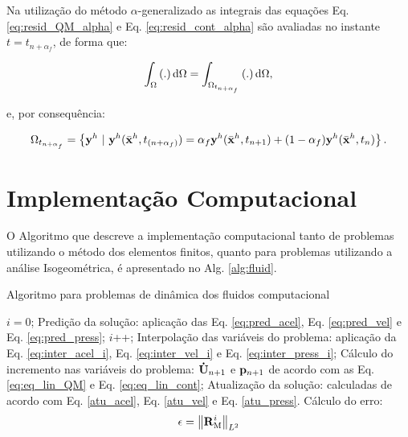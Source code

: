 \documentclass[tese_patricia]{subfiles}%
\begin{document}
Na utilização do método $\alpha$-generalizado as integrais das equações Eq. \eqref{eq:resid_QM_alpha} e Eq. \eqref{eq:resid_cont_alpha} são avaliadas no instante $t = t_{n+\alpha_{f}}$, de forma que:

\begin{align}
\int_{\Omega} \left(.\right) \mathrm{d} \Omega = \int_{\Omega_{t_{n+\alpha_{f}}}} \left(.\right) \mathrm{d} \Omega,
\end{align}

\noindent e, por consequência:

\begin{align}
\Omega_{t_{n+\alpha_{f}}} = \left\{\mathbf{y}^h \  |\  \mathbf{y}^h(\bar{\mathbf{x}}^h,t_{(n+\alpha_f)}) = \alpha_f \mathbf{y}^h(\bar{\mathbf{x}}^h,t_{n+1}) + (1-\alpha_f) \mathbf{y}^h(\bar{\mathbf{x}}^h,t_n)  \right\}.
\end{align}


\section{Implementação Computacional} \label{capitulo:Cap2:DFCComputationalCode}


O Algoritmo que descreve a implementação computacional tanto de problemas utilizando o método dos elementos finitos, quanto para problemas utilizando a análise Isogeométrica, é apresentado no Alg. \ref{alg:fluid}.

\begin{algorithm}
	\caption{Algoritmo para problemas de dinâmica dos fluidos computacional}
	\label{alg:fluid}
	\begin{algorithmic}[1]
		\State $i=0$;
		\State Predição da solução: aplicação das Eq. \eqref{eq:pred_acel}, Eq. \eqref{eq:pred_vel} e Eq. \eqref{eq:pred_press};
		\State $i$++;
		\State Interpolação das variáveis do problema: aplicação da Eq. \eqref{eq:inter_acel_i}, Eq. \eqref {eq:inter_vel_i} e Eq. \eqref{eq:inter_press_i};
		\State Cálculo do incremento nas variáveis do problema: $\mathbf{\dot{U}}_{n+1}$ e $\mathbf{p}_{n+1}$ de acordo com as Eq. \eqref{eq:eq_lin_QM} e Eq. \eqref{eq:eq_lin_cont};
		\State Atualização da solução: calculadas de acordo com Eq. \eqref{atu_acel}, Eq. \eqref{atu_vel} e Eq. \eqref{atu_press}.
		\State Cálculo do erro:
		\begin{align}
		\epsilon =\left\| \mathbf{R}_\mathrm{M}^i \right\|_{L^2}
		\end{align}
		\EndWhile
		\EndFor
	\end{algorithmic}
\end{algorithm}
\end{document}
